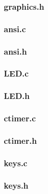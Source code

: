 \subsubsection*{graphics.h}

\newpage
\subsubsection*{ansi.c}

\newpage
\subsubsection*{ansi.h}

\newpage
\subsubsection*{LED.c}

\newpage
\subsubsection*{LED.h}

\newpage
\subsubsection*{ctimer.c}

\newpage
\subsubsection*{ctimer.h}

\newpage
\subsubsection*{keys.c}

\newpage
\subsubsection*{keys.h}

\newpage